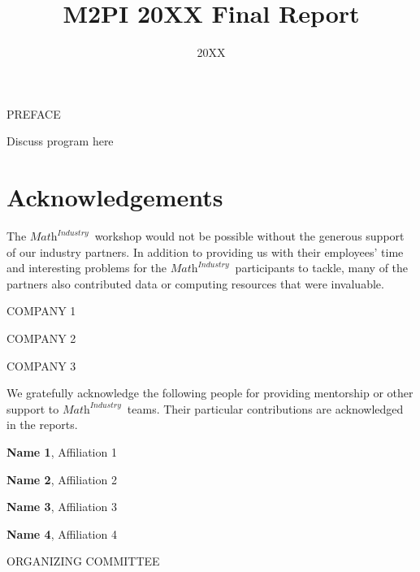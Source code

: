 \documentclass[11pt]{report}
\title{M2PI 20XX Final Report}
\author{}
\date{20XX}
\begin{document}
\newcommand{\mtopi}{$\textit{Math}^\textit{Industry}$~}
\newcommand{\person}[2]{\textbf{#1}, #2}
\sectionfont{\centering\sc\MakeLowercase}

\maketitle

\begin{center} PREFACE \end{center}
    Discuss program here

\section*{Acknowledgements}
The \mtopi workshop would not be possible without
the generous support of our industry partners. In addition to providing us with
their employees' time and interesting problems for the
\mtopi participants to tackle, many of the partners
also contributed data or computing resources that were invaluable.

\noindent\hrulefill

\begin{multicols}{2}
    \begin{flushleft}
        \uppercase{Company 1}
        
        \uppercase{Company 2}
     
        \uppercase{Company 3}
    \end{flushleft}
 \end{multicols}

\noindent\hrulefill

We gratefully acknowledge the following people for providing mentorship or
other support to \mtopi teams. Their particular contributions are acknowledged
in the reports.

\noindent\hrulefill

\begin{multicols}{2}
    \begin{flushleft} 
        \person{Name 1}{Affiliation 1}

        \person{Name 2}{Affiliation 2}

        \person{Name 3}{Affiliation 3}

        \person{Name 4}{Affiliation 4}
    \end{flushleft}
\end{multicols}

\newpage

\begin{center} ORGANIZING COMMITTEE \end{center}
\end{document}
